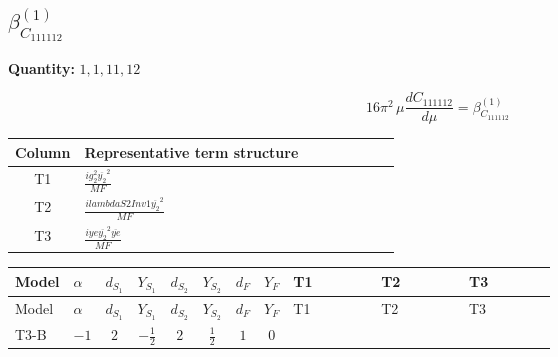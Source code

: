 \documentclass[8pt]{article}
\begin{document}
\begin{landscape}
\section*{$\beta_{C_{111112}}^{(1)}$}
\noindent\textbf{Quantity: }$\mathrm{1,1,11,12}$\par\smallskip
\[16\pi^2\,\mu\frac{d C_{111112}}{d\mu}=\beta_{C_{111112}}^{(1)}\]
\begin{center}
\begin{tabular}{@{}c >{\raggedright\arraybackslash}p{0.82\linewidth}@{}}
\toprule
Column & Representative term structure \\
\midrule
T1 & \(\displaystyle \frac{i g_{2}^{2} \overline{y_{2}}^{2}}{MF}\) \\
\midrule
T2 & \(\displaystyle \frac{i lambdaS2Inv1 \overline{y_{2}}^{2}}{MF}\) \\
\midrule
T3 & \(\displaystyle \frac{i ye \overline{y_{2}}^{2} \overline{ye}}{MF}\) \\
\midrule
\bottomrule
\end{tabular}
\end{center}
\smallskip
\tiny
\begin{longtable}{@{}llcccccc >{\raggedright\arraybackslash}p{0.21\linewidth} >{\raggedright\arraybackslash}p{0.21\linewidth} >{\raggedright\arraybackslash}p{0.21\linewidth}@{}}
\toprule
Model & $\alpha$ & $d_{S_1}$ & $Y_{S_1}$ & $d_{S_2}$ & $Y_{S_2}$ & $d_F$ & $Y_F$ & T1 & T2 & T3 \\
\midrule
\endfirsthead
\toprule
Model & $\alpha$ & $d_{S_1}$ & $Y_{S_1}$ & $d_{S_2}$ & $Y_{S_2}$ & $d_F$ & $Y_F$ & T1 & T2 & T3 \\
\midrule
\endhead
T3-B & $-1$ & $2$ & $-\frac{1}{2}$ & $2$ & $\frac{1}{2}$ & $1$ & $0$ & \scriptsize\adjustbox{max width=\linewidth}{$\begin{gathered} - \frac{3 i g_{2}^{2} \overline{y_{2}}^{2}}{4 MF}\end{gathered}$} & \scriptsize\adjustbox{max width=\linewidth}{$\begin{gathered} - \frac{i lambdaS2Inv1 \overline{y_{2}}^{2}}{2 MF}\end{gathered}$} & \scriptsize\adjustbox{max width=\linewidth}{$\begin{gathered} \frac{i ye \overline{y_{2}}^{2} \overline{ye}}{4 MF}\end{gathered}$} \\
\midrule
\bottomrule
\end{longtable}
\clearpage

\end{landscape}
\end{document}
